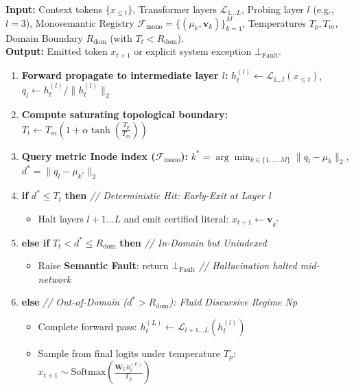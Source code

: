 \documentclass[11pt,a4paper]{article}
\theoremstyle{definition}
\begin{document}
\begin{tcolorbox}[top=4pt, bottom=4pt, title={\small \textbf{Algorithm 1: Unified Forward Pass with Intermediate Layer Geometric Gating and Early-Exit}}]
\small
\textbf{Input:} Context tokens $\{x_{\le t}\}$, Transformer layers $\mathcal{L}_{1 \dots L}$, Probing layer $l$ (e.g., $l=3$), Monosemantic Registry $\mathcal{F}_{\mathrm{mono}} = \{(\mu_k, \mathbf{v}_k)\}_{k=1}^M$, Temperatures $T_p, T_m$, Domain Boundary $R_{\mathrm{dom}}$ (with $T_t < R_{\mathrm{dom}}$). \\
\textbf{Output:} Emitted token $x_{t+1}$ or explicit system exception $\bot_{\mathrm{Fault}}$.
\begin{enumerate}[leftmargin=*, itemsep=1.0pt, topsep=1.0pt]
    \item \textbf{Forward propagate to intermediate layer $l$:}
    $h_t^{(l)} \leftarrow \mathcal{L}_{1 \dots l}(x_{\le t})$, \quad $q_l \leftarrow h_t^{(l)} / \|h_t^{(l)}\|_2$
    \item \textbf{Compute saturating topological boundary:}
    $T_t \leftarrow T_m \left( 1 + \alpha \tanh\left(\frac{T_p}{T_m}\right) \right)$
    \item \textbf{Query metric Inode index ($\mathcal{F}_{\mathrm{mono}}$):}
    $k^* = \arg\min_{k \in \{1, \dots, M\}} \|q_l - \mu_k\|_2$, \quad $d^* = \|q_l - \mu_{k^*}\|_2$
    \item \textbf{if} $d^* \le T_t$ \textbf{then} \hfill \textit{// Deterministic Hit: Early-Exit at Layer l}
    \begin{itemize}[leftmargin=14pt, itemsep=0.5pt, topsep=0.5pt]
        \item Halt layers $l+1 \dots L$ and emit certified literal: $x_{t+1} \leftarrow \mathbf{v}_{k^*}$
    \end{itemize}
    \item \textbf{else if} $T_t < d^* \le R_{\mathrm{dom}}$ \textbf{then} \hfill \textit{// In-Domain but Unindexed}
    \begin{itemize}[leftmargin=14pt, itemsep=0.5pt, topsep=0.5pt]
        \item Raise \textbf{Semantic Fault}: return $\bot_{\mathrm{Fault}}$ \hfill \textit{// Hallucination halted mid-network}
    \end{itemize}
    \item \textbf{else} \hfill \textit{// Out-of-Domain ($d^* > R_{\mathrm{dom}}$): Fluid Discursive Regime Np}
    \begin{itemize}[leftmargin=14pt, itemsep=0.5pt, topsep=0.5pt]
        \item Complete forward pass: $h_t^{(L)} \leftarrow \mathcal{L}_{l+1 \dots L}(h_t^{(l)})$
        \item Sample from final logits under temperature $T_p$: $x_{t+1} \sim \mathrm{Softmax}\left(\frac{\mathbf{W}_U h_t^{(L)}}{T_p}\right)$
    \end{itemize}
\end{enumerate}
\end{tcolorbox}
\end{document}
